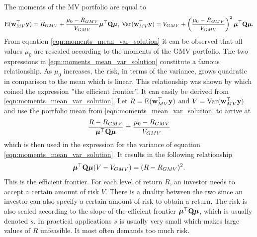 \documentclass[12pt, twoside]{book}\usepackage{knitr}
\begin{document}
The moments of the MV portfolio are equal to
\begin{equation}\label{eqn:moments_mean_var_solution}
\operatorname{E}(\mathbf{w}_{MV}^\top\mathbf{y}) = R_{GMV} + \frac{\mu_0 - R_{GMV}}{V_{GMV}} \mbox{\boldmath$\mu$}^\top \mathbf{Q} \mbox{\boldmath$\mu$}, \;
\operatorname{Var}(\mathbf{w}_{MV}^\top\mathbf{y}) =V_{GMV} + \left(\frac{\mu_0 - R_{GMV}}{V_{GMV}}\right)^2 \mbox{\boldmath$\mu$}^\top \mathbf{Q} \mbox{\boldmath$\mu$}.
\end{equation}
From equation \eqref{eqn:moments_mean_var_solution} it can be observed that all values $\mu_0$ are rescaled according to the moments of the GMV portfolio. 
The two expressions in \eqref{eqn:moments_mean_var_solution} constitute a famous relationship. 
As $\mu_0$ increases, the risk, in terms of the variance, grows quadratic in comparison to the mean which is linear. 
This relationship was shown by \citet{merton1972} which coined the expression ''the efficient frontier''.
It can easily be derived from \eqref{eqn:moments_mean_var_solution}.
Let $R =\operatorname{E}(\mathbf{w}_{MV}^\top\mathbf{y})$ and $V=\operatorname{Var}(\mathbf{w}_{MV}^\top\mathbf{y})$ and use the portfolio mean from \eqref{eqn:moments_mean_var_solution} to arrive at 
$$
\frac{R-R_{GMV}}{\mbox{\boldmath$\mu$}^\top \mathbf{Q} \mbox{\boldmath$\mu$}} = \frac{\mu_0 - R_{GMV}}{V_{GMV}}
$$
which is then used in the expression for the variance of equation \eqref{eqn:moments_mean_var_solution}. 
It results in the following relationship
\begin{equation}\label{eqn:efficient_frontier}
\mbox{\boldmath$\mu$}^\top \mathbf{Q} \mbox{\boldmath$\mu$} (V - V_{GMV}) = (R - R_{GMV})^2.
\end{equation}
This is the efficient frontier.
For each level of return $R$, an investor needs to accept a certain amount of risk $V$.
There is a duality between the two since an investor can also specify a certain amount of risk to obtain a return.
The risk is also scaled according to the slope of the efficient frontier $\mbox{\boldmath$\mu$}^\top \mathbf{Q} \mbox{\boldmath$\mu$}$, which is usually denoted $s$.
In practical applications $s$ is usually very small which makes large values of $R$ unfeasible.
It most often demands too much risk.
\end{document}
